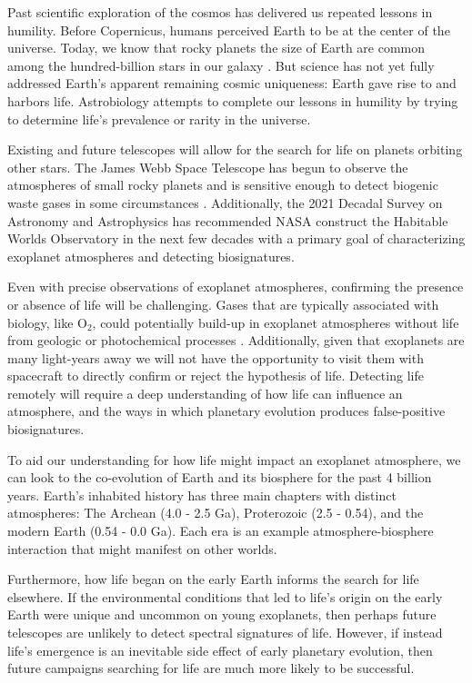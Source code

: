 
Past scientific exploration of the cosmos has delivered us repeated lessons in humility. Before Copernicus, humans perceived Earth to be at the center of the universe. Today, we know that rocky planets the size of Earth are common among the hundred-billion stars in our galaxy \citep{Burke_2015}. But science has not yet fully addressed Earth's apparent remaining cosmic uniqueness: Earth gave rise to and harbors life. Astrobiology attempts to complete our lessons in humility by trying to determine life's prevalence or rarity in the universe. 

Existing and future telescopes will allow for the search for life on planets orbiting other stars. The James Webb Space Telescope has begun to observe the atmospheres of small rocky planets and is sensitive enough to detect biogenic waste gases in some circumstances \citep{KrissansenTotton_2018_detect}. Additionally, the 2021 Decadal Survey on Astronomy and Astrophysics has recommended NASA construct the Habitable Worlds Observatory in the next few decades with a primary goal of characterizing exoplanet atmospheres and detecting biosignatures.

Even with precise observations of exoplanet atmospheres, confirming the presence or absence of life will be challenging. Gases that are typically associated with biology, like O$_2$, could potentially build-up in exoplanet atmospheres without life from geologic or photochemical processes \citep{KrissansenTotton_2021_oxygen,Meadows_2018}. Additionally, given that exoplanets are many light-years away we will not have the opportunity to visit them with spacecraft to directly confirm or reject the hypothesis of life. Detecting life remotely will require a deep understanding of how life can influence an atmosphere, and the ways in which planetary evolution produces false-positive biosignatures.

To aid our understanding for how life might impact an exoplanet atmosphere, we can look to the co-evolution of Earth and its biosphere for the past 4 billion years. Earth's inhabited history has three main chapters with distinct atmospheres: The Archean (4.0 - 2.5 Ga), Proterozoic (2.5 - 0.54), and the modern Earth (0.54 - 0.0 Ga). Each era is an example atmosphere-biosphere interaction that might manifest on other worlds.

Furthermore, how life began on the early Earth informs the search for life elsewhere. If the environmental conditions that led to life's origin on the early Earth were unique and uncommon on young exoplanets, then perhaps future telescopes are unlikely to detect spectral signatures of life. However, if instead life's emergence is an inevitable side effect of early planetary evolution, then future campaigns searching for life are much more likely to be successful.

